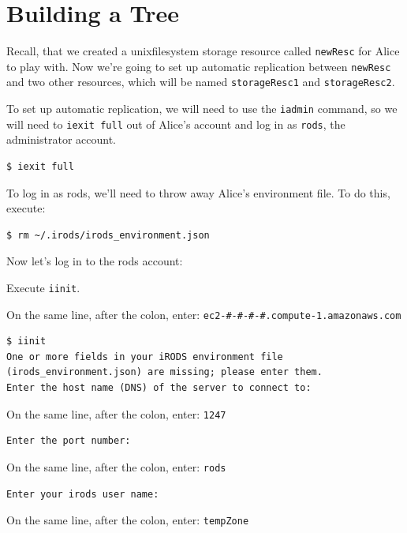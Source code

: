 \documentclass[10pt,oneside]{memoir}
\begin{document}
\section{Building a Tree}

Recall, that we created a unixfilesystem storage resource called \texttt{newResc} for Alice to play with. Now we're going to set up automatic replication between \texttt{newResc} and two other resources, which will be named \texttt{storageResc1} and \texttt{storageResc2}.

To set up automatic replication, we will need to use the \texttt{iadmin} command, so we will need to \texttt{iexit full} out of Alice's account and log in as \texttt{rods}, the administrator account.

\begin{lstlisting}
$ iexit full
\end{lstlisting}

To log in as rods, we'll need to throw away Alice's environment file. To do this, execute:

\begin{lstlisting}
$ rm ~/.irods/irods_environment.json
\end{lstlisting}

Now let's log in to the rods account:

Execute \texttt{iinit}.

On the same line, after the colon, enter: \texttt{ec2-\#-\#-\#-\#.compute-1.amazonaws.com}

\begin{lstlisting}[basicstyle=\scriptsize\ttfamily]
$ iinit
One or more fields in your iRODS environment file (irods_environment.json) are missing; please enter them.
Enter the host name (DNS) of the server to connect to:
\end{lstlisting}

On the same line, after the colon, enter: \texttt{1247}

\begin{lstlisting}[basicstyle=\scriptsize\ttfamily]
Enter the port number:
\end{lstlisting}

On the same line, after the colon, enter: \texttt{rods}

\begin{lstlisting}[basicstyle=\scriptsize\ttfamily]
Enter your irods user name:
\end{lstlisting}

On the same line, after the colon, enter: \texttt{tempZone}
\end{document}
